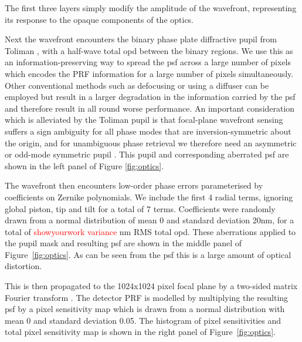 \documentclass[twocolumn]{spie}
\begin{document}
The first three layers simply modify the amplitude of the wavefront, representing its response to the opaque components of the optics. 

Next the wavefront encounters the binary phase plate diffractive pupil from Toliman \cite{tuthill2018}, with a half-wave total \ac{opd} between the binary regions. We use this as an information-preserving way to spread the \ac{psf} across a large number of pixels which encodes the PRF information for a large number of pixels simultaneously. Other conventional methods such as defocusing or using a diffuser \cite{Stefansson2017} can be employed but result in a larger degradation in the information carried by the \ac{psf} and therefore result in all round worse performance. An important consideration which is alleviated by the Toliman pupil is that focal-plane wavefront sensing suffers a sign ambiguity for all phase modes that are inversion-symmetric about the origin, and for unambiguous phase retrieval we therefore need an asymmetric or odd-mode symmetric pupil \cite{Martinache2013}. This pupil and corresponding aberrated \ac{psf} are shown in the left panel of Figure \ref{fig:optics}.

The wavefront then encounters low-order phase errors parameterised by coefficients on Zernike polynomials. We include the first 4 radial terms, ignoring global piston, tip and tilt for a total of 7 terms. Coefficients were randomly drawn from a normal distribution of mean 0 and standard deviation 20nm, for a total of \textcolor{red}{showyourwork variance} nm RMS total \ac{opd}. These aberrations applied to the pupil mask and resulting \ac{psf} are shown in the middle panel of Figure~\ref{fig:optics}. As can be seen from the \ac{psf} this is a large amount of optical distortion.

This is then propagated to the 1024x1024 pixel focal plane by a two-sided matrix Fourier transform \cite{Soummer2007,Martinache2020}. The detector PRF is modelled by multiplying the resulting \ac{psf} by a pixel sensitivity map which is drawn from a normal distribution with mean 0 and standard deviation 0.05. The histogram of pixel sensitivities and total pixel sensitivity map is shown in the right panel of Figure~\ref{fig:optics}.
\end{document}
